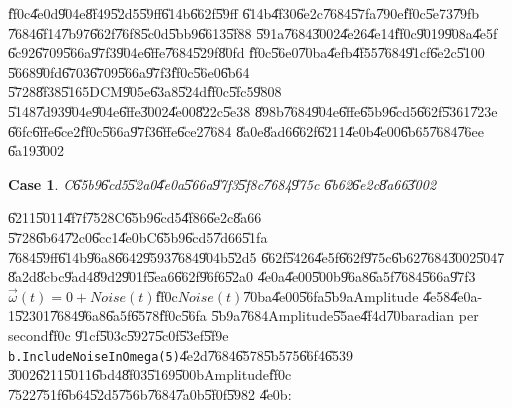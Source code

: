 \documentclass[12pt,a4paper]{article}
\newtheorem{case}[theorem]{Case}
\begin{document}
\U{ff0c}\U{4e0d}\U{904e}\U{8f49}\U{52d5}\U{59ff}\U{614b}\U{662f}\U{59ff}%
\U{614b}\U{4f30}\U{6e2c}\U{7684}\U{57fa}\U{790e}\U{ff0c}\U{5e73}\U{79fb}%
\U{7684}\U{6f14}\U{7b97}\U{662f}\U{76f8}\U{5c0d}\U{5bb9}\U{6613}\U{5f88}%
\U{591a}\U{7684}\U{3002}\U{4e26}\U{4e14}\U{ff0c}\U{9019}\U{908a}\U{4e5f}%
\U{6c92}\U{6709}\U{566a}\U{97f3}\U{904e}\U{6ffe}\U{7684}\U{529f}\U{80fd}%
\U{ff0c}\U{56e0}\U{70ba}\U{4efb}\U{4f55}\U{7684}\U{91cf}\U{6e2c}\U{5100}%
\U{5668}\U{90fd}\U{6703}\U{6709}\U{566a}\U{97f3}\U{ff0c}\U{56e0}\U{6b64}%
\U{5728}\U{8f38}\U{5165}DCM\U{905e}\U{63a8}\U{524d}\U{ff0c}\U{5fc5}\U{9808}%
\U{5148}\U{7d93}\U{904e}\U{904e}\U{6ffe}\U{3002}\U{4e00}\U{822c}\U{5e38}%
\U{898b}\U{7684}\U{904e}\U{6ffe}\U{65b9}\U{6cd5}\U{662f}\U{5361}\U{723e}%
\U{66fc}\U{6ffe}\U{6ce2}\U{ff0c}\U{566a}\U{97f3}\U{6ffe}\U{6ce2}\U{7684}%
\U{8a0e}\U{8ad6}\U{662f}\U{6211}\U{4e0b}\U{4e00}\U{6b65}\U{7684}\U{76ee}%
\U{6a19}\U{3002}

\bigskip

\begin{case}
C\U{65b9}\U{6cd5}\U{52a0}\U{4e0a}\U{566a}\U{97f3}\U{5f8c}\U{7684}\U{975c}%
\U{6b62}\U{6e2c}\U{8a66}\U{3002}
\end{case}

\U{6211}\U{5011}\U{4f7f}\U{7528}C\U{65b9}\U{6cd5}\U{4f86}\U{6e2c}\U{8a66}%
\U{5728}\U{6b64}\U{72c0}\U{6cc1}\U{4e0b}C\U{65b9}\U{6cd5}\U{7d66}\U{51fa}%
\U{7684}\U{59ff}\U{614b}\U{96a8}\U{6642}\U{9593}\U{7684}\U{904b}\U{52d5}%
\U{662f}\U{5426}\U{4e5f}\U{662f}\U{975c}\U{6b62}\U{7684}\U{3002}\U{5047}%
\U{8a2d}\U{8cbc}\U{9ad4}\U{89d2}\U{901f}\U{5ea6}\U{662f}\U{96f6}\U{52a0}%
\U{4e0a}\U{4e00}\U{500b}\U{96a8}\U{6a5f}\U{7684}\U{566a}\U{97f3}$\vec{\omega}%
(t)=0+Noise(t)$\U{ff0c}$Noise(t)$\U{70ba}\U{4e00}\U{56fa}\U{5b9a}Amplitude%
\U{4e58}\U{4e0a}-1\U{5230}1\U{7684}\U{96a8}\U{6a5f}\U{6578}\U{ff0c}\U{56fa}%
\U{5b9a}\U{7684}Amplitude\U{55ae}\U{4f4d}\U{70ba}radian per second\U{ff0c}%
\U{91cf}\U{503c}\U{5927}\U{5c0f}\U{53ef}\U{5f9e}\texttt{%
b.IncludeNoiseInOmega(5)}\U{4e2d}\U{7684}\U{6578}\U{5b57}5\U{66f4}\U{6539}%
\U{3002}\U{6211}\U{5011}\U{6bd4}\U{8f03}\U{5169}\U{500b}Amplitude\U{ff0c}%
\U{7522}\U{751f}\U{6b64}\U{52d5}\U{756b}\U{7684}\U{7a0b}\U{5f0f}\U{5982}%
\U{4e0b}:

\bigskip

\begin{mdframed}[leftline=false, rightline=false,backgroundcolor=bg]
\inputminted[linenos,fontsize=\footnotesize]{python}{../../Scripts/cordtrans/Development_zone/sketch-NoiseIncludeInCMethod.py}
\end{mdframed}%
\end{document}
